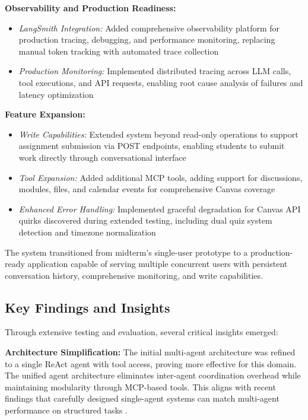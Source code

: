 \documentclass{article}
\begin{document}
\textbf{Observability and Production Readiness:}

\begin{itemize}

\item \textit{LangSmith Integration:} Added comprehensive observability platform \cite{langchain2024langsmith} for production tracing, debugging, and performance monitoring, replacing manual token tracking with automated trace collection

\item \textit{Production Monitoring:} Implemented distributed tracing across LLM calls, tool executions, and API requests, enabling root cause analysis of failures and latency optimization

\end{itemize}

\textbf{Feature Expansion:}

\begin{itemize}

\item \textit{Write Capabilities:} Extended system beyond read-only operations to support assignment submission via POST endpoints, enabling students to submit work directly through conversational interface

\item \textit{Tool Expansion:} Added additional MCP tools, adding support for discussions, modules, files, and calendar events for comprehensive Canvas coverage

\item \textit{Enhanced Error Handling:} Implemented graceful degradation for Canvas API quirks discovered during extended testing, including dual quiz system detection and timezone normalization

\end{itemize}

The system transitioned from midterm's single-user prototype to a production-ready application capable of serving multiple concurrent users with persistent conversation history, comprehensive monitoring, and write capabilities.

\subsection{Key Findings and Insights}


Through extensive testing and evaluation, several critical insights emerged:

\textbf{Architecture Simplification:} The initial multi-agent architecture was refined to a single ReAct agent with tool access, proving more effective for this domain. The unified agent architecture eliminates inter-agent coordination overhead while maintaining modularity through MCP-based tools. This aligns with recent findings that carefully designed single-agent systems can match multi-agent performance on structured tasks \cite{chen2024llmma}.
\end{document}
